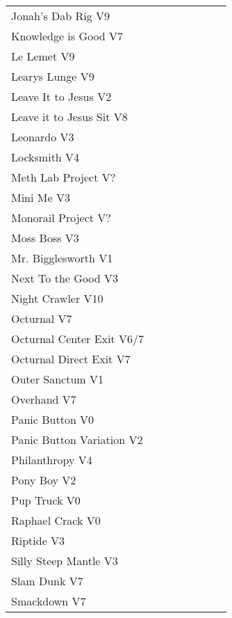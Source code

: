 \begin{center}
\begin{supertabular}{p{0.65\linewidth}r}
Jonah's Dab Rig V9 & \pageref{rt:Jonah's Dab Rig} \\
Knowledge is Good V7 & \pageref{rt:Knowledge is Good} \\
Le Lemet V9 & \pageref{rt:Le Lemet} \\
Learys Lunge V9 & \pageref{rt:Learys Lunge} \\
Leave It to Jesus V2 & \pageref{rt:Leave It to Jesus} \\
Leave it to Jesus Sit V8 & \pageref{vr:Leave it to Jesus Sit} \\
Leonardo V3 & \pageref{rt:Leonardo} \\
Locksmith V4 & \pageref{rt:Locksmith} \\
Meth Lab Project V? & \pageref{rt:Meth Lab Project} \\
Mini Me V3 & \pageref{rt:Mini Me} \\
Monorail Project V? & \pageref{rt:Monorail Project} \\
Moss Boss V3 & \pageref{rt:Moss Boss} \\
Mr. Bigglesworth V1 & \pageref{vr:Mr. Bigglesworth} \\
Next To the Good V3 & \pageref{rt:Next To the Good} \\
Night Crawler V10 & \pageref{rt:Night Crawler} \\
Octurnal V7 & \pageref{rt:Octurnal} \\
Octurnal Center Exit V6/7 & \pageref{vr:Octurnal Center Exit} \\
Octurnal Direct Exit V7 & \pageref{vr:Octurnal Direct Exit} \\
Outer Sanctum V1 & \pageref{rt:Outer Sanctum} \\
Overhand V7 & \pageref{rt:Overhand} \\
Panic Button V0 & \pageref{rt:Panic Button} \\
Panic Button Variation V2 & \pageref{vr:Panic Button Variation} \\
Philanthropy V4 & \pageref{rt:Philanthropy} \\
Pony Boy V2 & \pageref{rt:Pony Boy} \\
Pup Truck V0 & \pageref{rt:Pup Truck} \\
Raphael Crack V0 & \pageref{rt:Raphael Crack} \\
Riptide V3 & \pageref{rt:Riptide} \\
Silly Steep Mantle V3 & \pageref{rt:Silly Steep Mantle} \\
Slam Dunk V7 & \pageref{rt:Slam Dunk} \\
Smackdown V7 & \pageref{rt:Smackdown} \\

\end{supertabular}
\end{center}
